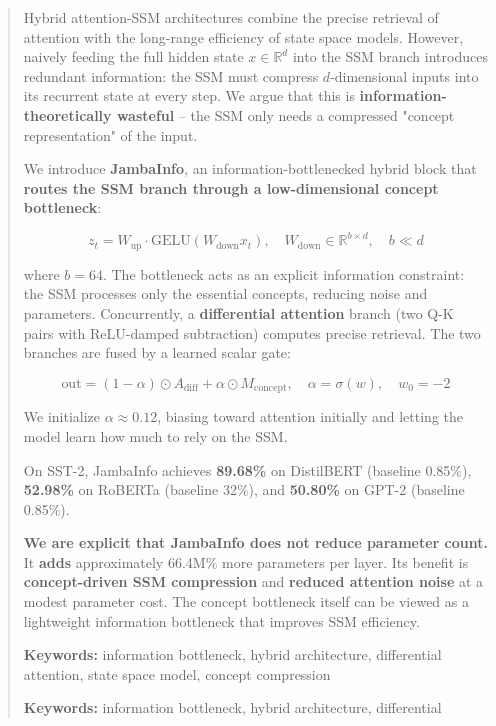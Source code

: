 \documentclass{article}
\begin{document}
\maketitle

\begin{abstract}
Hybrid attention-SSM architectures combine the precise retrieval of attention 
with the long-range efficiency of state space models. However, naively 
feeding the full hidden state $x \in \mathbb{R}^d$ into the SSM branch 
introduces redundant information: the SSM must compress $d$-dimensional 
inputs into its recurrent state at every step. We argue that this is 
\textbf{information-theoretically wasteful} -- the SSM only needs a compressed 
"concept representation" of the input.

We introduce \textbf{JambaInfo}, an information-bottlenecked hybrid block that 
\textbf{routes the SSM branch through a low-dimensional concept bottleneck}:

\[
z_t = W_\text{up} \cdot \text{GELU}(W_\text{down} x_t), 
\quad W_\text{down} \in \mathbb{R}^{b \times d}, \quad b \ll d
\]

where $b = 64$. The bottleneck acts as an explicit 
information constraint: the SSM processes only the essential concepts, 
reducing noise and parameters. Concurrently, a \textbf{differential attention} 
branch (two Q-K pairs with ReLU-damped subtraction) computes precise 
retrieval. The two branches are fused by a learned scalar gate:

\[
\text{out} = (1 - \alpha) \odot A_\text{diff} + \alpha \odot M_\text{concept},
\quad \alpha = \sigma(w), \quad w_0 = -2
\]

We initialize $\alpha \approx 0.12$, biasing toward attention initially 
and letting the model learn how much to rely on the SSM.

On SST-2, JambaInfo achieves \textbf{89.68\%} on DistilBERT (baseline 
0.85\%), \textbf{52.98\%} on RoBERTa (baseline 32\%), and 
\textbf{50.80\%} on GPT-2 (baseline 0.85\%).

\textbf{We are explicit that JambaInfo does not reduce parameter count.} It 
\textbf{adds} approximately 66.4M\% more parameters per layer. Its 
benefit is \textbf{concept-driven SSM compression} and \textbf{reduced attention noise} 
at a modest parameter cost. The concept bottleneck itself can be viewed as 
a lightweight information bottleneck that improves SSM efficiency.

\textbf{Keywords:} information bottleneck, hybrid architecture, differential 
attention, state space model, concept compression



\vspace{0.5em}
\noindent\textbf{Keywords:} information bottleneck, hybrid architecture, differential
\end{abstract}
\end{document}
